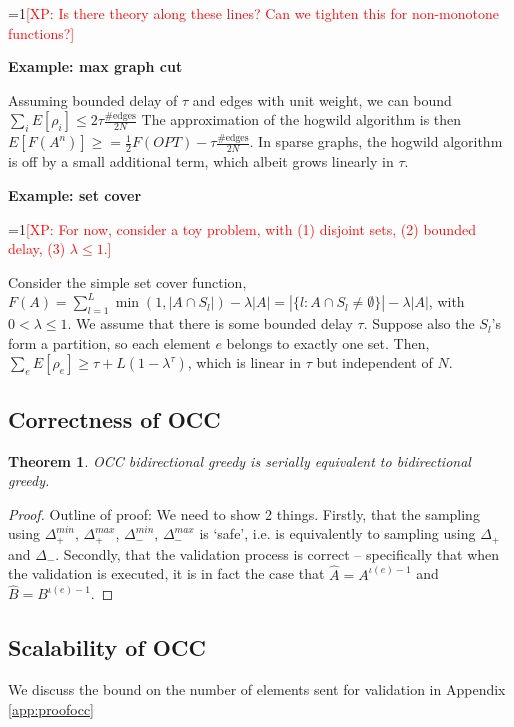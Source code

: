 \documentclass{article} %
\newtheorem{thm}{Theorem}[section]
\newcommand{\Comments}{1}
\newcommand{\note}[2]{\ifnum\Comments=1\textcolor{#1}{#2}\fi}
\newcommand{\taunghao}[1]{\note{red}{[XP: #1]}}
\begin{document}
\taunghao{Is there theory along these lines? Can we tighten this for non-monotone functions?}


\textbf{Example: max graph cut}

Assuming bounded delay of $\tau$ and edges with unit weight, we can bound $\sum_i E[\rho_i] \leq 2\tau\frac{\text{\#edges}}{2N}$
The approximation of the hogwild algorithm is then $E[F(A^n)] \geq = \frac{1}{2} F(OPT) - \tau\frac{\#\text{edges}}{2N}$.
In sparse graphs, the hogwild algorithm is off by a small additional term, which albeit grows linearly in $\tau$.



\textbf{Example: set cover}

\taunghao{For now, consider a toy problem, with (1) disjoint sets, (2) bounded delay, (3) $\lambda \leq 1$.}

Consider the simple set cover function,
$F(A) = \sum_{l=1}^L \min(1,|A\cap S_l|) - \lambda|A| = |\{l: A\cap S_l \neq\emptyset\}| - \lambda|A|$,
with $0 < \lambda \leq 1$.
We assume that there is some bounded delay $\tau$.
Suppose also the $S_l$'s form a partition, so each element $e$ belongs to exactly one set.
Then, $\sum_e E[\rho_e] \geq \tau + L(1-\lambda^\tau)$, which is linear in $\tau$ but independent of $N$.


\subsection{Correctness of OCC}
\begin{thm} OCC bidirectional greedy is serially equivalent to bidirectional greedy.
\end{thm}
\begin{proof}
Outline of proof: We need to show 2 things.
Firstly, that the sampling using $\Delta_+^{min}$, $\Delta_+^{max}$, $\Delta_-^{min}$, $\Delta_-^{max}$ is `safe', i.e. is equivalently to sampling using $\Delta_+$ and $\Delta_-$.
Secondly, that the validation process is correct -- specifically that when the validation is executed, it is in fact the case that $\hat{A} = A^{\iota(e)-1}$ and $\hat{B} = B^{\iota(e)-1}$.
\end{proof}



\subsection{Scalability of OCC}

We discuss the bound on the number of elements sent for validation in Appendix \ref{app:proofocc}
\end{document}
